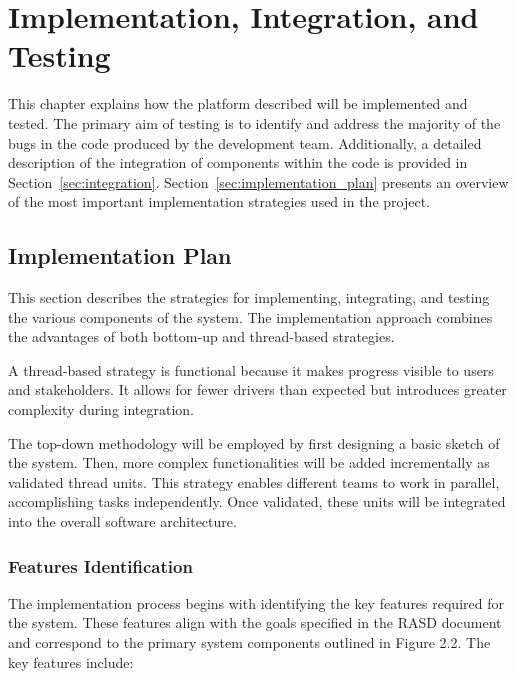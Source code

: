 \chapter{Implementation, Integration, and Testing}

This chapter explains how the platform described will be implemented and tested. The primary aim of testing is to identify and address the majority of the bugs in the code produced by the development team. Additionally, a detailed description of the integration of components within the code is provided in Section~\ref{sec:integration}. Section~\ref{sec:implementation_plan} presents an overview of the most important implementation strategies used in the project.

\section{Implementation Plan\label{sec:implementation_plan}}

This section describes the strategies for implementing, integrating, and testing the various components of the system. The implementation approach combines the advantages of both bottom-up and thread-based strategies.

A thread-based strategy is functional because it makes progress visible to users and stakeholders. It allows for fewer drivers than expected but introduces greater complexity during integration. 

The top-down methodology will be employed by first designing a basic sketch of the system. Then, more complex functionalities will be added incrementally as validated thread units. This strategy enables different teams to work in parallel, accomplishing tasks independently. Once validated, these units will be integrated into the overall software architecture.

\subsection{Features Identification\label{sec:features_identification}}

The implementation process begins with identifying the key features required for the system. These features align with the goals specified in the RASD document and correspond to the primary system components outlined in Figure 2.2. The key features include:

